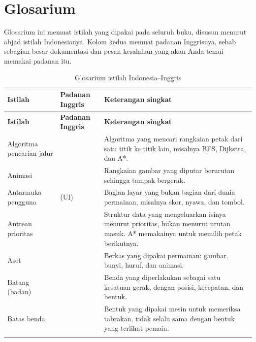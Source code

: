 \chapter{Glosarium}
\label{app:glosarium}

Glosarium ini memuat istilah yang dipakai pada seluruh buku, disusun menurut
abjad istilah Indonesianya. Kolom kedua memuat padanan Inggrisnya, sebab
sebagian besar dokumentasi dan pesan kesalahan yang akan Anda temui memakai
padanan itu.

\begin{longtable}{@{}L{3.9cm} L{3.6cm} L{7.2cm}@{}}
\caption{Glosarium istilah Indonesia--Inggris}
\label{tab:glosarium} \\
\toprule
\headrow \textbf{Istilah} & \textbf{Padanan Inggris} & \textbf{Keterangan singkat} \\
\midrule
\endfirsthead
\toprule
\headrow \textbf{Istilah} & \textbf{Padanan Inggris} & \textbf{Keterangan singkat} \\
\midrule
\endhead
\bottomrule
\endlastfoot

Algoritma pencarian jalur &  &
Algoritma yang mencari rangkaian petak dari satu titik ke titik lain, misalnya
BFS, Dijkstra, dan A*. \\ \addlinespace

Animasi &  &
Rangkaian gambar yang diputar berurutan sehingga tampak bergerak. \\
\addlinespace

Antarmuka pengguna &  (UI) &
Bagian layar yang bukan bagian dari dunia permainan, misalnya skor, nyawa, dan
tombol. \\ \addlinespace

Antrean prioritas &  &
Struktur data yang mengeluarkan isinya menurut prioritas, bukan menurut urutan
masuk. A* memakainya untuk memilih petak berikutnya. \\ \addlinespace

Aset &  &
Berkas yang dipakai permainan: gambar, bunyi, huruf, dan animasi. \\
\addlinespace

Batang (badan) &  &
Benda yang diperlakukan sebagai satu kesatuan gerak, dengan posisi, kecepatan,
dan bentuk. \\ \addlinespace

Batas benda &  &
Bentuk yang dipakai mesin untuk memeriksa tabrakan, tidak selalu sama dengan
bentuk yang terlihat pemain. \\ \addlinespace


\end{longtable}
